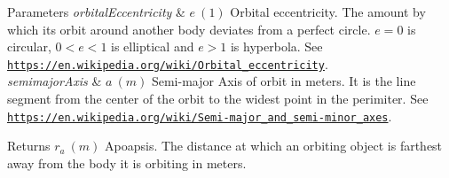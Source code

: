 \begin{DoxyParams}{Parameters}
{\em orbital\+Eccentricity} & $e\ (1)$ Orbital eccentricity. The amount by which its orbit around another body deviates from a perfect circle. $e=0$ is circular, $ 0<e<1$ is elliptical and $e>1$ is hyperbola. See \href{https://en.wikipedia.org/wiki/Orbital_eccentricity}{\tt https\+://en.\+wikipedia.\+org/wiki/\+Orbital\+\_\+eccentricity}. \\
\hline
{\em semimajor\+Axis} & $a\ (m)$ Semi-\/major Axis of orbit in meters. It is the line segment from the center of the orbit to the widest point in the perimiter. See \href{https://en.wikipedia.org/wiki/Semi-major_and_semi-minor_axes}{\tt https\+://en.\+wikipedia.\+org/wiki/\+Semi-\/major\+\_\+and\+\_\+semi-\/minor\+\_\+axes}. \\
\hline
\end{DoxyParams}
\begin{DoxyReturn}{Returns}
$r_a\ (m)$ Apoapsis. The distance at which an orbiting object is farthest away from the body it is orbiting in meters. 
\end{DoxyReturn}
